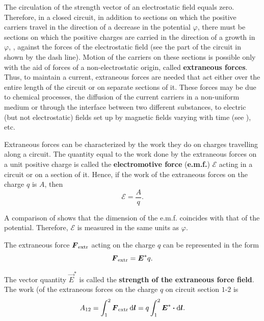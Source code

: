 The circulation of the strength vector of an electrostatic field equals zero. Therefore, in a closed circuit, in addition to sections on which the positive carriers travel in the direction of a decrease in the potential $\varphi$, there must be sections on which the positive charges are carried in the direction of a growth in $\varphi$, \ie, against the forces of the electrostatic field (see the part of the circuit in  shown by the dash line). Motion of the carriers on these sections is possible only with the aid of forces of a non-electrostatic origin, called \textbf{extraneous forces}. Thus, to maintain a current, extraneous forces are needed that act either over the entire length of the circuit or on separate sections of it. These forces may be due to chemical processes, the diffusion of the current carriers in a non-uniform medium or through the interface between two different substances, to electric (but not electrostatic) fields set up by magnetic fields varying with time (see ), etc.

Extraneous forces can be characterized by the work they do on charges travelling along a circuit. The quantity equal to the work done by the extraneous forces on a unit positive charge is called the \textbf{electromotive force} (\textbf{e.m.f.}) $\mathcal{E}$ acting in a circuit or on a section of it. Hence, if the work of the extraneous forces on the charge $q$ is $A$, then
\begin{equation}\label{eq:5_13}
    \mathcal{E} = \frac{A}{q}.
\end{equation}

A comparison of  shows that the dimension of the e.m.f. coincides with that of the potential. Therefore, $\mathcal{E}$ is measured in the same units as $\varphi$.

The extraneous force $\boldsymbol{F}_{\text{extr}}$ acting on the charge $q$ can be represented in the form
\begin{equation}\label{eq:5_14}
    \boldsymbol{F}_{\text{extr}} = \boldsymbol{E}^* q.
\end{equation}

\noindent
The vector quantity $\vec{E}^*$ is called the \textbf{strength of the extraneous force field}. The work (of the extraneous forces on the charge $q$ on circuit section $1$-$2$ is
\begin{equation*}
    A_{12} = \int_1^2 \boldsymbol{F}_{\text{extr}}\, \mathrm{d}\boldsymbol{l} = q \int_1^2 \boldsymbol{E}^* \boldsymbol{\cdot} \mathrm{d}\boldsymbol{l}.
\end{equation*}

